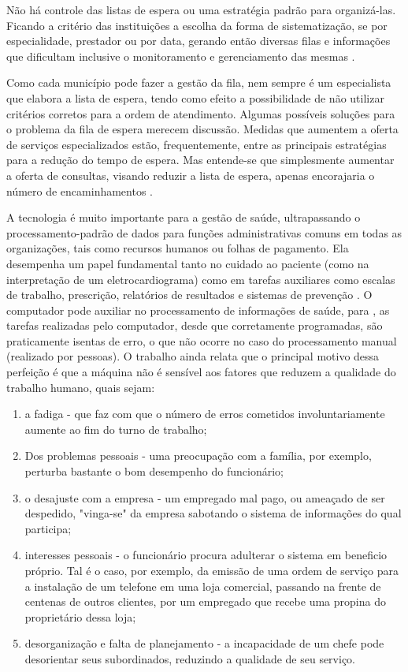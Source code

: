 Não há controle das listas de espera ou uma estratégia padrão para organizá-las. Ficando a critério das instituições a escolha da forma de sistematização, se por especialidade, prestador ou por data, gerando então diversas filas e informações que dificultam inclusive o monitoramento e gerenciamento das mesmas \cite{URSULA2018}.
    
Como cada município pode fazer a gestão da fila, nem sempre é um especialista que elabora a lista de espera, tendo como efeito a possibilidade de não utilizar critérios corretos para a ordem de atendimento. Algumas possíveis soluções para o problema da fila de espera merecem discussão. Medidas que aumentem a oferta de serviços especializados estão, frequentemente, entre as principais estratégias para a redução do tempo de espera. Mas entende-se que simplesmente aumentar a oferta de consultas, visando reduzir a lista de espera, apenas encorajaria o número de encaminhamentos \cite{Gazzinelli2014}.

A tecnologia é muito importante para a gestão de saúde, ultrapassando o processamento-padrão de dados para funções administrativas comuns em todas as organizações, tais como recursos humanos ou folhas de pagamento. Ela desempenha um papel fundamental tanto no cuidado ao paciente (como na interpretação de um eletrocardiograma) como em tarefas auxiliares como escalas de trabalho, prescrição, relatórios de resultados e sistemas de prevenção \cite{Pinochet2014}. O computador pode auxiliar no processamento de informações de saúde, para , as tarefas realizadas pelo computador, desde que corretamente programadas, são praticamente isentas de erro, o que não ocorre no caso do processamento manual (realizado por pessoas). O trabalho ainda relata que o principal motivo dessa perfeição é que a máquina não é sensível aos fatores que reduzem a qualidade do trabalho humano, quais sejam:

  \begin{enumerate}
    	\item a fadiga - que faz com que o número de erros cometidos involuntariamente aumente ao fim do turno de trabalho;
        \item Dos problemas pessoais - uma preocupação com a família, por exemplo, perturba bastante o bom desempenho do funcionário;
        \item o desajuste com a empresa - um empregado mal pago, ou ameaçado de ser despedido, "vinga-se" da empresa sabotando o sistema de informações do qual participa;
        \item interesses pessoais - o funcionário procura adulterar o sistema em beneficio próprio. Tal é o caso, por exemplo, da emissão de uma ordem de serviço para a instalação de um telefone em uma loja comercial, passando na frente de centenas de outros clientes, por um empregado que recebe uma propina do proprietário dessa loja;
        \item desorganização e falta de planejamento - a incapacidade de um chefe pode desorientar seus subordinados, reduzindo a qualidade de seu serviço.
    \end{enumerate}
    
